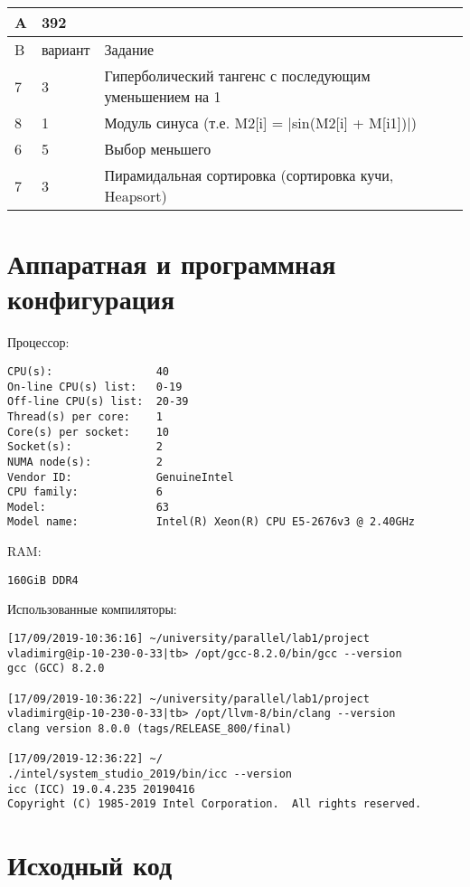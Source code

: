 \documentclass[a4paper,14pt,russian]{extarticle}
\begin{document}
\begin{table}[h]
	\begin{tabular}{|l|l|l|}
		\hline
		A &	392&	 \\\hline
		B&	вариант&	Задание\\\hline
		7&	3&	Гиперболический тангенс с последующим уменьшением на 1\\\hline
		8&	1&	Модуль синуса (т.е. M2[i] = |sin(M2[i] + M[i1])|)\\\hline
		6&	5&	Выбор меньшего\\\hline
		7&	3&	Пирамидальная сортировка (сортировка кучи, Heapsort)\\\hline
	\end{tabular}
\end{table}


\section{Аппаратная и программная конфигурация}


Процессор:
\begin{lstlisting}
CPU(s):                40
On-line CPU(s) list:   0-19
Off-line CPU(s) list:  20-39
Thread(s) per core:    1
Core(s) per socket:    10
Socket(s):             2
NUMA node(s):          2
Vendor ID:             GenuineIntel
CPU family:            6
Model:                 63
Model name:            Intel(R) Xeon(R) CPU E5-2676v3 @ 2.40GHz
\end{lstlisting}

RAM:
\begin{verbatim}
160GiB DDR4
\end{verbatim}

Использованные компиляторы:
\begin{lstlisting}
[17/09/2019-10:36:16] ~/university/parallel/lab1/project
vladimirg@ip-10-230-0-33|tb> /opt/gcc-8.2.0/bin/gcc --version
gcc (GCC) 8.2.0

[17/09/2019-10:36:22] ~/university/parallel/lab1/project
vladimirg@ip-10-230-0-33|tb> /opt/llvm-8/bin/clang --version
clang version 8.0.0 (tags/RELEASE_800/final)

[17/09/2019-12:36:22] ~/
./intel/system_studio_2019/bin/icc --version
icc (ICC) 19.0.4.235 20190416
Copyright (C) 1985-2019 Intel Corporation.  All rights reserved.
\end{lstlisting}


\section{Исходный код}
\end{document}
